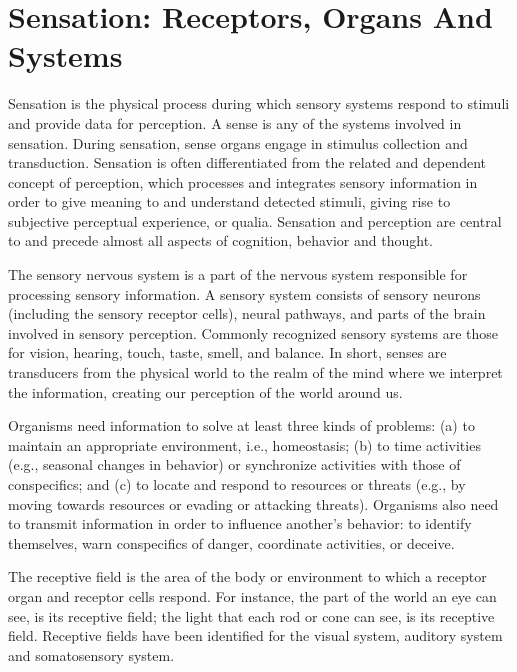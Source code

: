 \hypertarget{sensation-receptors-organs-and-systems}{%
\section{Sensation: Receptors, Organs And
Systems}\label{sensation-receptors-organs-and-systems}}

Sensation is the physical process during which sensory systems respond
to stimuli and provide data for perception. A sense is any of the
systems involved in sensation. During sensation, sense organs engage in
stimulus collection and transduction. Sensation is often differentiated
from the related and dependent concept of perception, which processes
and integrates sensory information in order to give meaning to and
understand detected stimuli, giving rise to subjective perceptual
experience, or qualia. Sensation and perception are central to and
precede almost all aspects of cognition, behavior and thought.

The sensory nervous system is a part of the nervous system responsible
for processing sensory information. A sensory system consists of sensory
neurons (including the sensory receptor cells), neural pathways, and
parts of the brain involved in sensory perception. Commonly recognized
sensory systems are those for vision, hearing, touch, taste, smell, and
balance. In short, senses are transducers from the physical world to the
realm of the mind where we interpret the information, creating our
perception of the world around us.

Organisms need information to solve at least three kinds of problems:
(a) to maintain an appropriate environment, i.e., homeostasis; (b) to
time activities (e.g., seasonal changes in behavior) or synchronize
activities with those of conspecifics; and (c) to locate and respond to
resources or threats (e.g., by moving towards resources or evading or
attacking threats). Organisms also need to transmit information in order
to influence another's behavior: to identify themselves, warn
conspecifics of danger, coordinate activities, or deceive.

The receptive field is the area of the body or environment to which a
receptor organ and receptor cells respond. For instance, the part of the
world an eye can see, is its receptive field; the light that each rod or
cone can see, is its receptive field. Receptive fields have been
identified for the visual system, auditory system and somatosensory
system.

